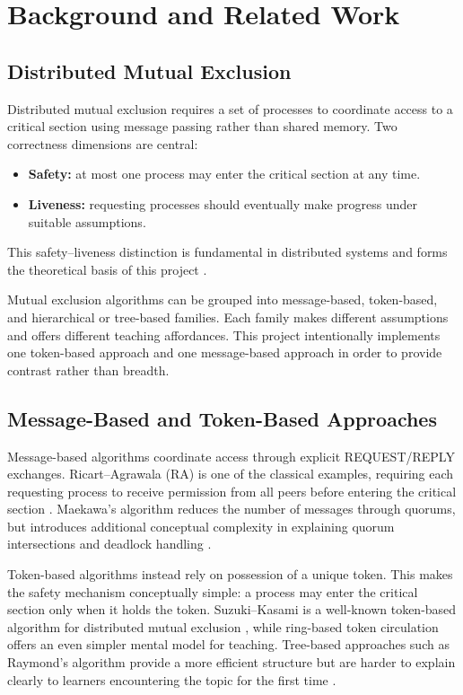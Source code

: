 \chapter{Background and Related Work}
\label{ch:background}

\section{Distributed Mutual Exclusion}
Distributed mutual exclusion requires a set of processes to coordinate access to a critical section using message passing rather than shared memory. Two correctness dimensions are central:
\begin{itemize}
  \item \textbf{Safety:} at most one process may enter the critical section at any time.
  \item \textbf{Liveness:} requesting processes should eventually make progress under suitable assumptions.
\end{itemize}
This safety--liveness distinction is fundamental in distributed systems and forms the theoretical basis of this project \cite{lynch1996distributed,attiya2004distributed,tel2000introduction}.

Mutual exclusion algorithms can be grouped into message-based, token-based, and hierarchical or tree-based families. Each family makes different assumptions and offers different teaching affordances. This project intentionally implements one token-based approach and one message-based approach in order to provide contrast rather than breadth.

\section{Message-Based and Token-Based Approaches}
Message-based algorithms coordinate access through explicit REQUEST/REPLY exchanges. Ricart--Agrawala (RA) is one of the classical examples, requiring each requesting process to receive permission from all peers before entering the critical section \cite{ricart1981optimal}. Maekawa's algorithm reduces the number of messages through quorums, but introduces additional conceptual complexity in explaining quorum intersections and deadlock handling \cite{maekawa1985sqrt}.

Token-based algorithms instead rely on possession of a unique token. This makes the safety mechanism conceptually simple: a process may enter the critical section only when it holds the token. Suzuki--Kasami is a well-known token-based algorithm for distributed mutual exclusion \cite{suzuki1985distributed}, while ring-based token circulation offers an even simpler mental model for teaching. Tree-based approaches such as Raymond's algorithm provide a more efficient structure but are harder to explain clearly to learners encountering the topic for the first time \cite{raymond1989tree}.

